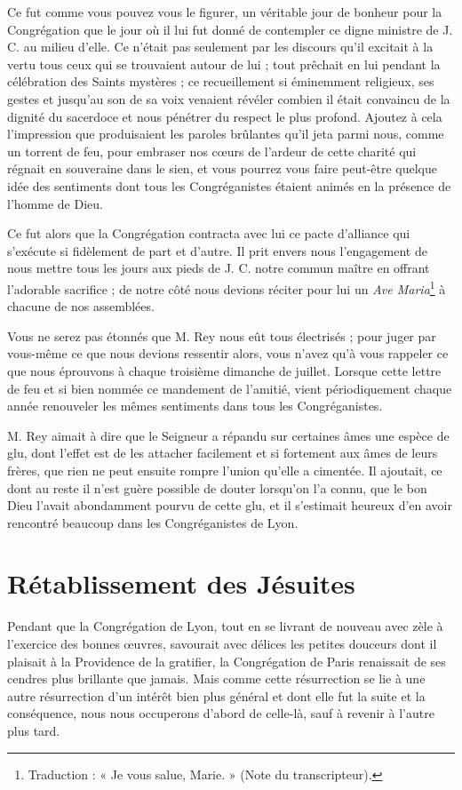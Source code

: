Ce fut comme vous pouvez vous le figurer, un véritable jour de bonheur pour la Congrégation que le jour où il lui fut donné de contempler ce digne ministre de J. C. au milieu d'elle. Ce n'était pas seulement par les discours qu'il excitait à la vertu tous ceux qui se trouvaient autour de lui ; tout prêchait en lui pendant la célébration des Saints mystères ; ce recueillement si éminemment religieux, ses gestes et jusqu'au son de sa voix venaient révéler combien il était convaincu de la dignité du sacerdoce et nous pénétrer du respect le plus profond. Ajoutez à cela l'impression que produisaient les paroles brûlantes qu'il jeta parmi nous, comme un torrent de feu, pour embraser nos cœurs de l'ardeur de cette charité qui régnait en souveraine dans le sien, et vous pourrez vous faire peut-être quelque idée des sentiments dont tous les Congréganistes étaient animés en la présence de l'homme de Dieu.

Ce fut alors que la Congrégation contracta avec lui ce pacte d'alliance qui s'exécute si fidèlement de part et d'autre. Il prit envers nous l'engagement de nous mettre tous les jours aux pieds de J. C. notre commun maître en offrant l'adorable sacrifice ; de notre côté nous devions réciter pour lui un \textit{Ave Maria}\footnote{Traduction : « Je vous salue, Marie. » (Note du transcripteur).} à chacune de nos assemblées.

Vous ne serez pas étonnés que M. Rey nous eût tous
électrisés ; pour juger par vous-même ce que nous devions ressentir alors, vous n'avez qu'à vous rappeler ce que nous éprouvons à chaque troisième dimanche de juillet. Lorsque cette lettre de feu et si bien nommée ce mandement de l'amitié, vient périodiquement chaque année renouveler les mêmes sentiments dans tous les Congréganistes.

M. Rey aimait à dire que le Seigneur a répandu sur certaines âmes une espèce de glu, dont l'effet est de les attacher facilement et si fortement aux âmes de leurs frères, que rien ne peut ensuite rompre l'union qu'elle a cimentée. Il ajoutait, ce dont au reste il n'est guère possible de douter lorsqu'on l'a connu, que le bon Dieu l'avait abondamment pourvu de cette glu, et il s'estimait heureux d'en avoir rencontré beaucoup dans les Congréganistes de Lyon.

\section*{Rétablissement des Jésuites}
Pendant que la Congrégation de Lyon, tout en se livrant de nouveau avec zèle à l'exercice des bonnes œuvres, savourait avec délices les petites douceurs dont il plaisait à la Providence de la gratifier, la Congrégation de Paris renaissait de ses cendres plus brillante que jamais. Mais comme cette résurrection se lie à une autre résurrection d'un intérêt bien plus général et dont elle fut la suite et la conséquence, nous nous occuperons d'abord de celle-là, sauf à revenir à l'autre plus tard.

